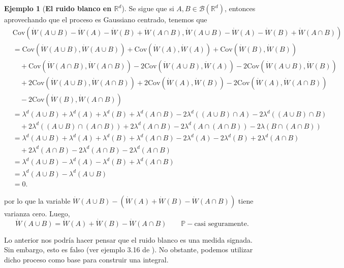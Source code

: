 \documentclass[letterpaper,twoside,12pt]{book}
\newcommand{\R}{\mathbb{R}}
\newcommand{\B}{\mathcal{B}}
\renewcommand{\P}{\mathbb{P}}
\newcommand{\W}{\dot{W}}
\newcommand{\1}{\mathds{1}}
\theoremstyle{definition}
\theoremstyle{definition}
\theoremstyle{definition}
\theoremstyle{definition}
\theoremstyle{definition}
\theoremstyle{definition}
\newtheorem{ejem}{Ejemplo}
\theoremstyle{definition}
\begin{document}
\begin{ejem}[\textbf{El ruido blanco en $\R^{d}$}]
Se sigue que si $A,B\in \B(\R^d)$, entonces aprovechando que el proceso es Gaussiano centrado, tenemos que
\begin{align*}
    &\text{Cov}\left(\W(A\cup B)-\W(A)-\W(B)+\W(A\cap B),\W(A\cup B)-\W(A)-\W(B)+\W(A\cap B)\right)\\
    &=\text{Cov}\left(\W(A\cup B),\W(A\cup B)\right)+\text{Cov}\left(\W(A),\W(A)\right)+\text{Cov}\left(\W(B),\W(B)\right)\\
    &\quad +\text{Cov}\left(\W(A\cap B),\W(A\cap B)\right)-2 \text{Cov}\left(\W(A\cup B),\W(A)\right)-2 \text{Cov}\left(\W(A\cup B), \W(B)\right)\\
    &\quad +2 \text{Cov}\left(\W(A\cup B), \W(A\cap B)\right)+2 \text{Cov}\left(\W(A),\W(B)\right)-2 \text{Cov}\left(\W(A),\W(A\cap B)\right)\\
    &\quad -2 \text{Cov}\left(\W(B),\W(A\cap B)\right)\\
    &=\lambda^{d}(A\cup B)+\lambda^{d}(A)+\lambda^{d}(B)+\lambda^{d}(A\cap B)-2\lambda^{d}((A\cup B)\cap A)-2\lambda^{d}((A\cup B)\cap B)\\
    &\quad+2\lambda^{d}((A\cup B)\cap (A\cap B))+2\lambda^{d}(A\cap B)-2\lambda^{d}(A\cap (A\cap B))-2\lambda(B\cap(A\cap B))\\
    &=\lambda^{d}(A\cup B)+\lambda^d(A)+\lambda^{d}(B)+\lambda^{d}(A\cap B)-2\lambda^{d}(A)-2\lambda^{d}(B)+2\lambda^{d}(A\cap B)\\
    &\quad +2\lambda^{d}(A\cap B)-2\lambda^{d}(A\cap B)-2\lambda^{d}(A\cap B)\\
    &=\lambda^{d}(A\cup B)-\lambda^d(A)-\lambda^{d}(B)+\lambda^{d}(A\cap B)\\
    &=\lambda^{d}(A\cup B)-\lambda^{d}(A\cup B)\\
    &=0.
\end{align*}

por lo que la variable $\W(A\cup B)-(\W(A)+\W(B)-\W(A\cap B))$ tiene varianza cero. Luego,
\begin{equation}\label{Wdotmeasure}    
    \W(A\cup B)=\W(A)+\W(B)-\W(A\cap B) \qquad \P-\text{casi seguramente}.
\end{equation}


\end{ejem}
Lo anterior nos podría hacer pensar que el ruido blanco es una medida signada. Sin embargo, esto es falso (ver ejemplo 3.16 de \cite{Khoshnevisan2009}). No obstante, podemos utilizar dicho proceso como base para construir una integral.
\end{document}
